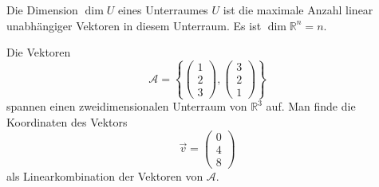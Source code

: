 \begin{definition}
Die Dimension $\dim U$ eines Unterraumes $U$ ist die maximale Anzahl
linear unabhängiger Vektoren in diesem Unterraum.
Es ist $\dim\mathbb R^n=n$.
\end{definition}

\begin{beispiel}
Die Vektoren \[
\mathcal{A}=\left\{
\begin{pmatrix}1\\2\\3\end{pmatrix},
\begin{pmatrix}3\\2\\1\end{pmatrix}
\right\}
\]
spannen einen zweidimensionalen Unterraum von $\mathbb R^3$ auf.
Man finde
die Koordinaten des Vektors
\[
\vec{v}
=
\begin{pmatrix}
0\\4\\8
\end{pmatrix}
\]
als Linearkombination der Vektoren von $\mathcal{A}$.


\end{beispiel}
